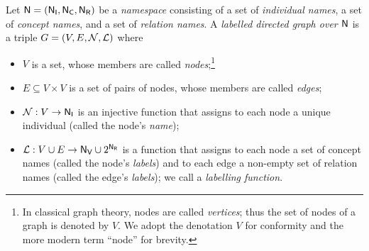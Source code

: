 %
\begin{definition}
  \label{def:ld_graph}
  Let $\textup{\textsf{N}}=(\mathsf{N}_\mathsf{I},\mathsf{N}_\mathsf{C},\mathsf{N}_\mathsf{R})$ be a \emph{namespace} consisting of a set \NI of \emph{individual names}, a set \NC of \emph{concept names}, and a set \NR of \emph{relation names}.
  A \emph{labelled directed graph over $\textup{\textsf{N}}$} is a triple $G = (V,E,\mathcal{N},\mathcal{L})$
  where
  \begin{itemize}
    \item
      $V$ is a set, whose members are called \emph{nodes};\footnote{%
        In classical graph theory, nodes are called \emph{vertices}; thus the set of
        nodes of a graph is denoted by $V$. We adopt the denotation $V$ for conformity
        and the more modern term \enquote{node} for brevity.%
      }      
    \item 
      $E \subseteq V \times V$ is a set of pairs of nodes, whose members are called \emph{edges};
    \item
      $\mathcal{N} : V \to \mathsf{N}_\mathsf{I}$ is an injective function that assigns
      to each node a unique individual (called the node's \emph{name});
    \item
      $\mathcal{L} : V \cup E \to \mathsf{N}_\mathsf{V} \cup 2^{\mathsf{N}_\mathsf{R}}$ is a function that assigns 
      to each node a set of concept names (called the node's \emph{labels}) and
      to each edge a non-empty set of relation names (called the edge's \emph{labels});
      we call \Lmc a \emph{labelling function}.
  \end{itemize}
\end{definition}
